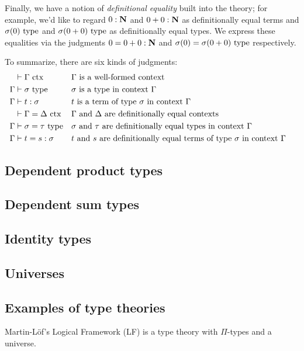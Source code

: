 \documentclass[a4paper]{article}
\begin{document}
Finally, we have a notion of \emph{definitional equality} built into the theory; for example, we'd like to regard $0 : \mathbf{N}$ and $0 + 0 : \mathbf{N}$ as definitionally equal terms and $\sigma(0)~\mathrm{type}$ and $\sigma(0+0)~\mathrm{type}$ as definitionally equal types.
We express these equalities via the judgments $0 = 0 + 0 : \mathbf{N}$ and $\sigma(0) = \sigma(0+0)~\mathrm{type}$ respectively.

To summarize, there are six kinds of judgments:
\begin{align*}
  &\vdash \Gamma~\mathrm{ctx} && \text{$\Gamma$ is a well-formed context}&&\\
  \Gamma &\vdash \sigma~\mathrm{type} && \text{$\sigma$ is a type in context $\Gamma$}&&\\
  \Gamma &\vdash t : \sigma && \text{$t$ is a term of type $\sigma$ in context $\Gamma$}&&\\
  &\vdash \Gamma = \Delta~\mathrm{ctx} && \text{$\Gamma$ and $\Delta$ are definitionally equal contexts}&&\\
  \Gamma &\vdash \sigma = \tau~\mathrm{type} && \text{$\sigma$ and $\tau$ are definitionally equal types in context $\Gamma$}&&\\
  \Gamma &\vdash t = s : \sigma && \text{$t$ and $s$ are definitionally equal terms of type $\sigma$ in context $\Gamma$}&&\\
\end{align*}

\subsection{Dependent product types}\label{sec:dpt}
\subsection{Dependent sum types}\label{sec:dst}
\subsection{Identity types}\label{sec:it}
\subsection{Universes}\label{sec:u}
\subsection{Examples of type theories}\label{sec:eott}

Martin-L\"of's Logical Framework (LF) is a type theory with $\Pi$-types and a universe.
\end{document}
